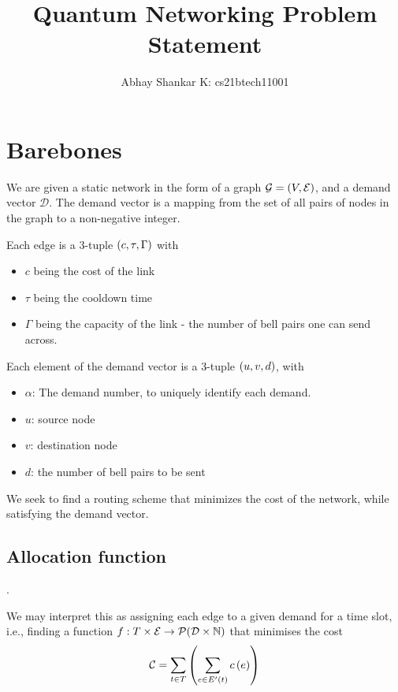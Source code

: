 \documentclass{amsart}
\begin{document}
    \title{Quantum Networking Problem Statement}
    \author{Abhay Shankar K: cs21btech11001}
    \maketitle

    \section{Barebones}

    We are given a static network in the form of a graph \(\mathcal{G} = \left(V, \mathcal{E}\right)\), and a demand vector \(\mathcal{D}\). The demand vector is a mapping from the set of all pairs of nodes in the graph to a non-negative integer. 

    Each edge is a 3-tuple \(\left(c, \tau, \Gamma\right)\) with \begin{itemize}
        \item \(c\) being the cost of the link
        \item \(\tau\) being the cooldown time
        \item \(\Gamma\) being the capacity of the link - the number of bell pairs one can send across.
    \end{itemize}

    Each element of the demand vector is a 3-tuple \(\left(u, v, d\right)\), with \begin{itemize}
        \item \(\alpha\): The demand number, to uniquely identify each demand.
        \item \(u\): source node
        \item \(v\): destination node
        \item \(d\): the number of bell pairs to be sent
    \end{itemize}

    We seek to find a routing scheme that minimizes the cost of the network, while satisfying the demand vector. 
    
    \subsection{Allocation function}.

    We may interpret this as assigning each edge to a given demand for a time slot, i.e., finding a function \(f : T \times \mathcal{E} \rightarrow \mathcal{P}(\mathcal{D \times \mathbb{N}})\) that minimises the cost 
        \[\mathcal{C} = \sum_{t \in T} \left(\sum_{e \in E'(t)} c\left(e\right)\right)\]
\end{document}
